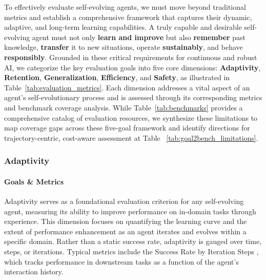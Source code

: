 To effectively evaluate self-evolving agents, we must move beyond traditional metrics and establish a comprehensive framework that captures their dynamic, adaptive, and long-term learning capabilities. A truly capable and desirable self-evolving agent must not only \textbf{learn and improve} but also \textbf{remember} past knowledge, \textbf{transfer} it to new situations, operate \textbf{sustainably}, and behave \textbf{responsibly}. Grounded in these critical requirements for continuous and robust AI, we categorize the key evaluation goals into five core dimensions: \textbf{Adaptivity}, \textbf{Retention}, \textbf{Generalization}, \textbf{Efficiency}, and \textbf{Safety}, as illustrated in Table~\ref{tab:evaluation_metrics}. Each dimension addresses a vital aspect of an agent’s self-evolutionary process and is assessed through its corresponding metrics and benchmark coverage analysis.
While Table~\ref{tab:benchmarks} provides a comprehensive catalog of evaluation resources, we synthesize these limitations to map coverage gaps across these five-goal framework and identify directions for trajectory-centric, cost-aware assessment at  Table ~\ref{tab:goal2bench_limitations}.


\subsubsection{Adaptivity}
\paragraph{Goals \& Metrics} Adaptivity serves as a foundational evaluation criterion for any self-evolving agent, measuring its ability to improve performance on in-domain tasks through experience. This dimension focuses on quantifying the learning curve and the extent of performance enhancement as an agent iterates and evolves within a specific domain. Rather than a static success rate, adaptivity is gauged over time, steps, or iterations. 
Typical metrics include the Success Rate by Iteration Steps \citep{hu2024automated, wang2024agent, zheng2025lifelongagentbench}, which tracks performance in downstream tasks as a function of the agent's interaction history. 


